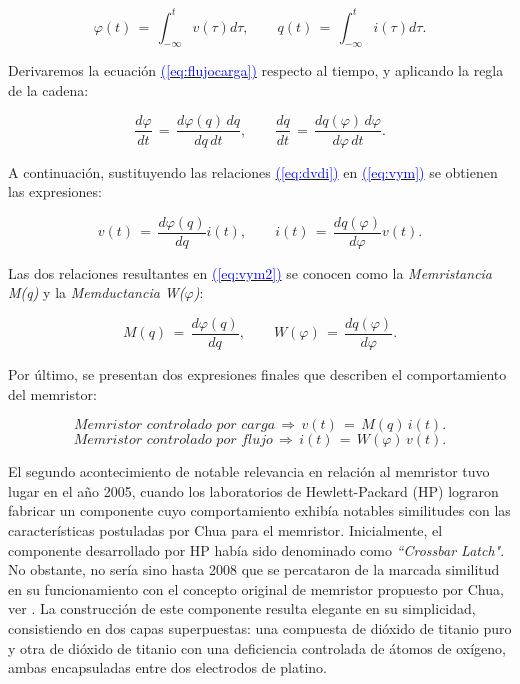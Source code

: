\documentclass[12pt,a4paper]{report} %
\newcommand{\eref}[1]{\hyperref[#1]{\textcolor{blue}{(\ref*{#1})}}}
\begin{document}
	\begin{equation}
		\varphi(t)\,=\,\int_{-\infty}^{t}v(\tau)d\tau, \qquad q(t)\,=\,\int_{-\infty}^{t}i(\tau)d\tau.
		\label{eq:flujocargaintegral}
	\end{equation}\smallskip
	
	\noindent Derivaremos la ecuación \eref{eq:flujocarga} respecto al tiempo, y aplicando la regla de la cadena:
	
	\begin{equation}
		\frac{d\varphi}{dt}\,=\,\frac{d\varphi(q)\,dq}{dq\,dt}, \qquad \frac{dq}{dt}\,=\,\frac{dq(\varphi)\,d\varphi}{d\varphi\,dt}.
		\label{eq:vym}
	\end{equation}\smallskip
	
	\noindent A continuación, sustituyendo las relaciones \eref{eq:dvdi} en \eref{eq:vym} se obtienen las expresiones:
	
	\begin{equation}
		v(t)\,=\,\frac{d\varphi(q)}{dq}i(t), \qquad i(t)\,=\,\frac{dq(\varphi)}{d\varphi}v(t).
		\label{eq:vym2}
	\end{equation}\smallskip
	
	\noindent Las dos relaciones resultantes en \eref{eq:vym2} se conocen como la \textit{Memristancia M(q)} y la \textit{Memductancia W($\varphi$)}:
	
	\begin{equation}
		M(q)\,=\,\frac{d\varphi(q)}{dq}, \qquad W(\varphi)\,=\,\frac{dq(\varphi)}{d\varphi}.
		\label{eq:myw}
	\end{equation}\smallskip
	
	\noindent Por último, se presentan dos expresiones finales que describen el comportamiento del memristor:
	
	\begin{equation}
		\textit{Memristor controlado por carga} \, \Rightarrow \, v(t)\,=\,M(q)\,i(t).
		\label{eq:cc}
	\end{equation}\smallskip
	\begin{equation}
		\textit{Memristor controlado por flujo} \, \Rightarrow \, i(t)\,=\,W(\varphi)\,v(t).
		\label{eq:fc}
	\end{equation}\smallskip
	
	\newpage
	
	 El segundo acontecimiento de notable relevancia en relación al memristor tuvo lugar en el año 2005, cuando los laboratorios de Hewlett-Packard (HP) lograron fabricar un componente cuyo comportamiento exhibía notables similitudes con las características postuladas por Chua para el memristor. Inicialmente, el componente desarrollado por HP había sido denominado como \textit{``Crossbar Latch"}. No obstante, no sería sino hasta 2008 que se percataron de la marcada similitud en su funcionamiento con el concepto original de memristor propuesto por Chua, ver \cite{williams}. La construcción de este componente resulta elegante en su simplicidad, consistiendo en dos capas superpuestas: una compuesta de dióxido de titanio puro y otra de dióxido de titanio con una deficiencia controlada de átomos de oxígeno, ambas encapsuladas entre dos electrodos de platino.
	
\end{document}
